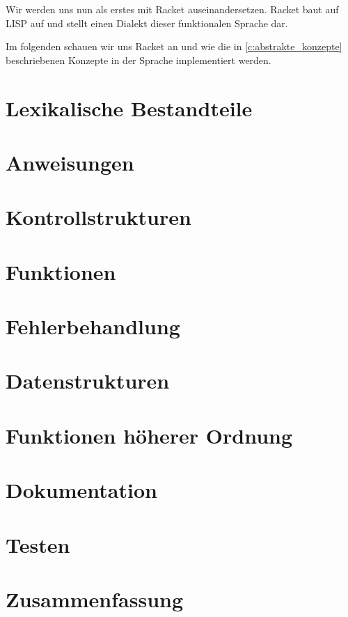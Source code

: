 Wir werden uns nun als erstes mit Racket auseinandersetzen. Racket baut auf LISP auf und stellt einen Dialekt dieser funktionalen Sprache dar.

Im folgenden schauen wir uns Racket an und wie die in \ref{c:abstrakte_konzepte} beschriebenen Konzepte in der Sprache implementiert werden.

\section{Lexikalische Bestandteile}
	

\section{Anweisungen}
	

\section{Kontrollstrukturen}
	

\section{Funktionen}
	

\section{Fehlerbehandlung}
	

\section{Datenstrukturen}
	

\section{Funktionen höherer Ordnung}
	

\section{Dokumentation}
	

\section{Testen}
	

\section{Zusammenfassung}
	
